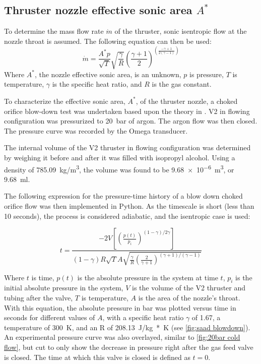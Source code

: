         \subsection{Thruster nozzle effective sonic area $A^*$}

            To determine the mass flow rate $\dot{m}$ of the thruster,  sonic isentropic flow at the nozzle throat is assumed. The following equation can then be used:
            \begin{equation}
                \dot{m} = \frac{A^* p}{\sqrt{T}}\sqrt{\frac{\gamma}{R}}\left(\frac{\gamma + 1}{2}\right)^(\frac{-\gamma + 1}{2(\gamma-1)})
            \end{equation}
            Where $A^*$, the nozzle effective sonic area, is an unknown, $p$ is pressure, $T$ is temperature, $\gamma$ is the specific heat ratio, and $R$ is the gas constant.
        
            To characterize the effective sonic area, $A^*$, of the thruster nozzle, a choked orifice blow-down test was undertaken based upon the theory in \textcite{saadCompressibleFluidFlow}. V2 in flowing configuration was pressurized to \qty{20}{bar} of argon. The argon flow was then closed. The pressure curve was recorded by the Omega transducer.

            The internal volume of the V2 thruster in flowing configuration was determined by weighing it before and after it was filled with isopropyl alcohol. Using a density of \qty{785.09}{kg/m^3}, the volume was found to be \qty{9.68e-6}{m^3}, or \qty{9.68}{ml}.

            The following expression for the pressure-time history of a blow down choked orifice flow \cite{saadCompressibleFluidFlow} was then implemented in Python. As the timescale is short (less than 10 seconds), the process is considered adiabatic, and the isentropic case is used:

            \begin{equation}
                t =  \frac{-2V \left[\left(\frac{p(t)}{p_i}\right)^{(1-\gamma) / 2\gamma}\right]}{(1-\gamma) R \sqrt{T} A \sqrt{\frac{\gamma}{R}(\frac{2}{\gamma + 1})^{(\gamma+1) / (\gamma-1)}}}
            \end{equation}

            Where $t$ is time, $p(t)$ is the absolute pressure in the system at time $t$, $p_i$ is the initial absolute pressure in the system, $V$ is the volume of the V2 thruster and tubing after the valve, $T$ is temperature, $A$ is the area of the nozzle's throat. With this equation, the absolute pressure in bar was plotted versus time in seconds for different values of $A$, with a specific heat ratio $\gamma$ of 1.67, a temperature of \qty{300}{K}, and an R of \qty{208.13}{J/kg*K} (see \autoref{fig:saad blowdown}). An experimental pressure curve was also overlayed, similar to \autoref{fig:20bar cold flow}, but cut to only show the decrease in pressure right after the gas feed valve is closed. The time at which this valve is closed is defined as $t=0$.

